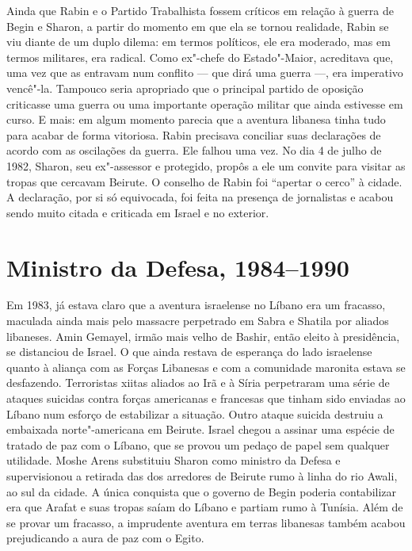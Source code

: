 Ainda que Rabin e o Partido Trabalhista fossem críticos em relação à
guerra de Begin e Sharon, a partir do momento em que ela se tornou
realidade, Rabin se viu diante de um duplo dilema: em termos políticos,
ele era moderado, mas em termos militares, era radical. Como ex"-chefe do
Estado"-Maior, acreditava que, uma vez que as  entravam num conflito
--- que dirá uma guerra ---, era imperativo vencê"-la. Tampouco seria
apropriado que o principal partido de oposição criticasse uma guerra ou
uma importante operação militar que ainda estivesse em curso. E mais: em
algum momento parecia que a aventura libanesa tinha tudo para acabar de
forma vitoriosa. Rabin precisava conciliar suas declarações de acordo
com as oscilações da guerra. Ele falhou uma vez. No dia 4 de julho de
1982, Sharon, seu ex"-assessor e protegido, propôs a ele um convite para
visitar as tropas que cercavam Beirute. O conselho de Rabin foi
``apertar o cerco'' à cidade. A declaração, por si só equivocada, foi
feita na presença de jornalistas e acabou sendo muito citada e criticada
em Israel e no exterior.

\section{Ministro da Defesa, 1984--1990}

Em 1983, já estava claro que a aventura israelense no Líbano era um
fracasso, maculada ainda mais pelo massacre perpetrado em Sabra e
Shatila por aliados libaneses. Amin Gemayel, irmão mais velho de Bashir,
então eleito à presidência, se distanciou de Israel. O que ainda restava
de esperança do lado israelense quanto à aliança com as Forças
Libanesas e com a comunidade maronita estava se desfazendo. Terroristas
xiitas aliados ao Irã e à Síria perpetraram uma série de ataques
suicidas contra forças americanas e francesas que tinham sido enviadas
ao Líbano num esforço de estabilizar a situação. Outro ataque suicida
destruiu a embaixada norte"-americana em Beirute. Israel chegou a assinar
uma espécie de tratado de paz com o Líbano, que se provou um pedaço de
papel sem qualquer utilidade. Moshe Arens substituiu Sharon como
ministro da Defesa e supervisionou a retirada das  dos arredores de
Beirute rumo à linha do rio Awali, ao sul da cidade. A única conquista
que o governo de Begin poderia contabilizar era que Arafat e suas
tropas saíam do Líbano e partiam rumo à Tunísia. Além de se provar um fracasso, a
imprudente aventura em terras libanesas também acabou prejudicando a
aura de paz com o Egito.

